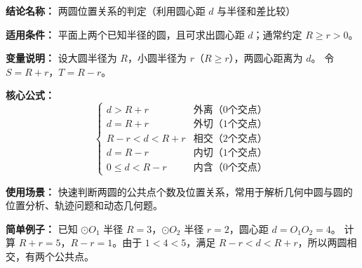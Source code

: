 \textbf{结论名称：} 两圆位置关系的判定（利用圆心距 $d$ 与半径和差比较）

\textbf{适用条件：} 平面上两个已知半径的圆，且可求出圆心距 $d$；通常约定 $R \ge r > 0$。

\textbf{变量说明：} 设大圆半径为 $R$，小圆半径为 $r$（$R \ge r$），两圆心距离为 $d$。  
令 $S = R+r$，$T = R-r$。

\textbf{核心公式：}
\[
\boxed{
\begin{cases}
d > R+r & \text{外离（0个交点）}\\[2pt]
d = R+r & \text{外切（1个交点）}\\[2pt]
R-r < d < R+r & \text{相交（2个交点）}\\[2pt]
d = R-r & \text{内切（1个交点）}\\[2pt]
0 \le d < R-r & \text{内含（0个交点）}
\end{cases}
}
\]

\textbf{使用场景：} 快速判断两圆的公共点个数及位置关系，常用于解析几何中圆与圆的位置分析、轨迹问题和动态几何题。

\textbf{简单例子：} 已知 $\odot O_1$ 半径 $R=3$，$\odot O_2$ 半径 $r=2$，圆心距 $d = O_1O_2 = 4$。  
计算 $R+r=5$，$R-r=1$。由于 $1 < 4 < 5$，满足 $R-r < d < R+r$，所以两圆相交，有两个公共点。
